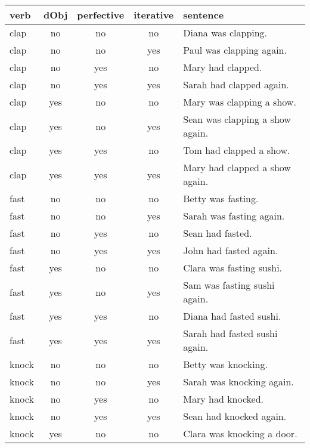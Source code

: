 \begin{longtable}{l|ccc|p{5cm}}
\textbf{verb}     & \textbf{dObj} & \textbf{perfective} & \textbf{iterative}    & \textbf{sentence} \\
\hline
\endhead
clap    & no   & no   & no   & Diana was clapping.                    \\
clap    & no   & no   & yes  & Paul was clapping again.               \\
clap    & no   & yes  & no   & Mary had clapped.                      \\
clap    & no   & yes  & yes  & Sarah had clapped again.               \\
clap    & yes  & no   & no   & Mary was clapping a show.              \\
clap    & yes  & no   & yes  & Sean was clapping a show again.        \\
clap    & yes  & yes  & no   & Tom had clapped a show.                \\
clap    & yes  & yes  & yes  & Mary had clapped a show again.         \\
fast    & no   & no   & no   & Betty was fasting.                     \\
fast    & no   & no   & yes  & Sarah was fasting again.               \\
fast    & no   & yes  & no   & Sean had fasted.                       \\
fast    & no   & yes  & yes  & John had fasted again.                 \\
fast    & yes  & no   & no   & Clara was fasting sushi.               \\
fast    & yes  & no   & yes  & Sam was fasting sushi again.           \\
fast    & yes  & yes  & no   & Diana had fasted sushi.                \\
fast    & yes  & yes  & yes  & Sarah had fasted sushi again.          \\
knock   & no   & no   & no   & Betty was knocking.                    \\
knock   & no   & no   & yes  & Sarah was knocking again.              \\
knock   & no   & yes  & no   & Mary had knocked.                      \\
knock   & no   & yes  & yes  & Sean had knocked again.                \\
knock   & yes  & no   & no   & Clara was knocking a door.             \\

\end{longtable}
